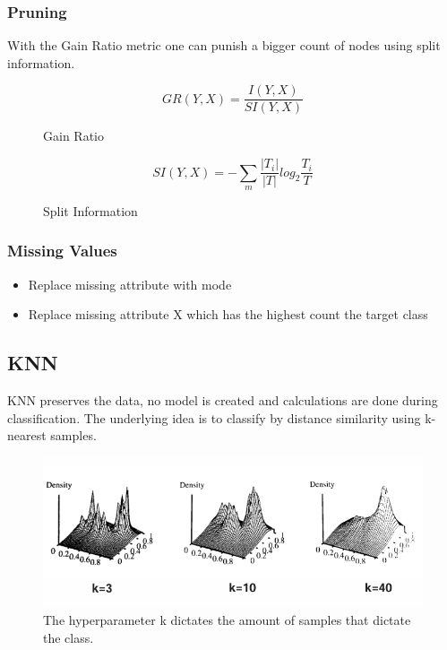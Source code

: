 \documentclass[../Main.tex]{subfiles}
\begin{document}
\subsubsection{Pruning}
With the Gain Ratio metric one can punish a bigger count of nodes using split information.
\begin{figure}[H]
    \begin{equation}
        GR(Y,X) = \frac{I(Y,X)}{SI(Y,X)}
    \end{equation}
    \caption{Gain Ratio}
\end{figure}
\begin{figure}[H]
    \begin{equation}
        SI(Y,X) = - \sum_{m} \frac{|T_i|}{|T|} log_2 \frac{T_i}{T}
    \end{equation}
    \caption{Split Information}
\end{figure}
\subsubsection{Missing Values}
\begin{itemize}
    \item Replace missing attribute with mode
    \item Replace missing attribute X which has the highest count the target class 
\end{itemize}

\subsection{KNN}
KNN preserves the data, no model is created and calculations are done during classification.
The underlying idea is to classify by distance similarity using k-nearest samples.

\begin{figure}[H]
    \centering
    \includegraphics[width=0.75\linewidth]{Images/datan/k-parameter-knn.png}
    \caption{The hyperparameter k dictates the amount of samples that dictate the class.}
\end{figure}
\end{document}
